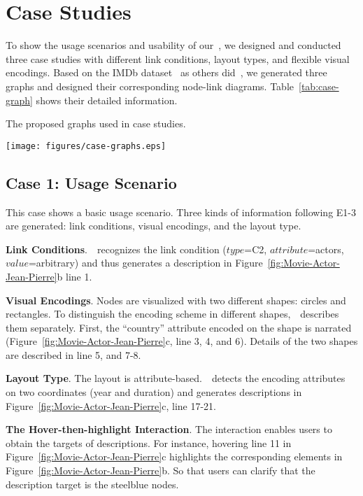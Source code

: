 \section{Case Studies} \label{sec:casestudy}

To show the usage scenarios and usability of our~\ApproachName, we designed and conducted three case studies with different link conditions, layout types, and flexible visual encodings.
Based on the IMDb dataset~\cite{IMDb-extensive-dataset} as others did~\cite{DBLP:conf/ieeevast/BigelowNML19, DBLP:journals/ivs/LiuNS14, DBLP:journals/tkde/HerschelNST12}, we generated three graphs and designed their corresponding node-link diagrams. Table~\ref{tab:case-graph} shows their detailed information.

\begin{table*}[t]
\normalsize
\centering
\caption{The proposed graphs used in case studies. }\label{tab:case-graph}
\texttt{[image: figures/case-graphs.eps]}
\vspace{-10pt}
\end{table*}


\subsection{Case 1: Usage Scenario}
This case shows a basic usage scenario. 
Three kinds of information following E1-3 are generated: link conditions, visual encodings, and the layout type.

\noindent \textbf{Link Conditions}.~\ApproachName~recognizes the link condition ($type$=C2, $attribute$=actors, $value$=arbitrary) and thus generates a description in Figure~\ref{fig:Movie-Actor-Jean-Pierre}b line 1.

\noindent \textbf{Visual Encodings}. Nodes are visualized with two different shapes: circles and rectangles.
To distinguish the encoding scheme in different shapes,~\ApproachName~describes them separately.
First, the ``country'' attribute encoded on the shape is narrated (Figure~\ref{fig:Movie-Actor-Jean-Pierre}c, line 3, 4, and 6).
Details of the two shapes are described in line 5, and 7-8.

\noindent \textbf{Layout Type}.
The layout is attribute-based.~\ApproachName~detects the encoding attributes on two coordinates (year and duration) and generates descriptions in Figure~\ref{fig:Movie-Actor-Jean-Pierre}c, line 17-21.

\noindent \textbf{The Hover-then-highlight Interaction}.
The interaction enables users to obtain the targets of descriptions. For instance, hovering line 11 in Figure~\ref{fig:Movie-Actor-Jean-Pierre}c highlights the corresponding elements in Figure~\ref{fig:Movie-Actor-Jean-Pierre}b. So that users can clarify that the description target is the steelblue nodes.


